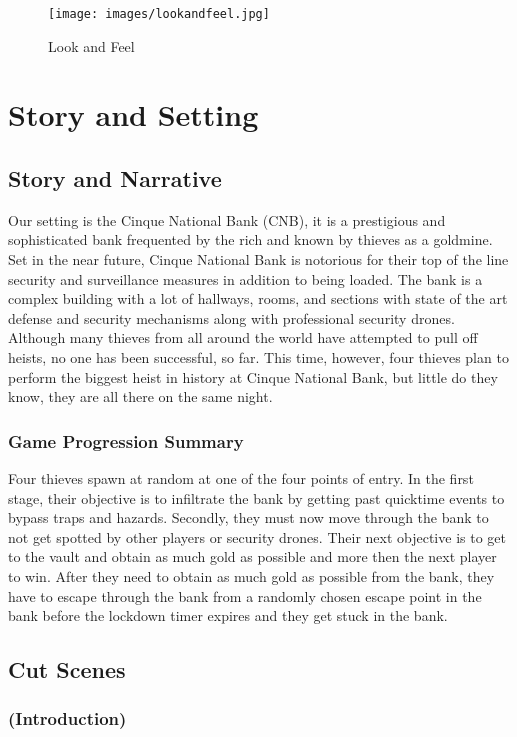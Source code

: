 \documentclass[11pt]{report}
\begin{document}
\begin{figure}[H]
	\texttt{[image: images/lookandfeel.jpg]}
	\caption{Look and Feel}
\end{figure}

\chapter{Story and Setting}

\section{Story and Narrative}

Our setting is the Cinque National Bank (CNB), it is a prestigious and sophisticated bank frequented by the rich and known by thieves as a goldmine. Set in the near future, Cinque National Bank is notorious for their top of the line security and surveillance measures in addition to being loaded.  The bank is a complex building with a lot of hallways, rooms, and sections with state of the art defense and security mechanisms along with professional security drones. Although many thieves from all around the world have attempted to pull off heists, no one has been successful, so far. This time, however, four thieves plan to perform the biggest heist in history at Cinque National Bank, but little do they know, they are all there on the same night.

\subsection{Game Progression Summary}

Four thieves spawn at random at one of the four points of entry. In the first stage, their objective is to infiltrate the bank by getting past quicktime events to bypass traps and hazards. Secondly, they must now move through the bank to not get spotted by other players or security drones. 
Their next objective is to get to the vault and obtain as much gold as possible and more then the next player to win. After they need to obtain as much gold as possible from the bank, they have to escape through the bank from a randomly chosen escape point in the bank before the lockdown timer expires and they get stuck in the bank.

\section{Cut Scenes}
\subsection{(Introduction)}
\end{document}
